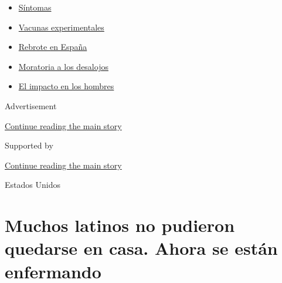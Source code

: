 \begin{itemize}
\tightlist
\item
  \href{https://www.nytimes3xbfgragh.onion/es/interactive/2020/08/06/espanol/ciencia-y-tecnologia/tengo-covid-19-sintomas.html?name=styln-coronavirus-es\&region=TOP_BANNER\&block=storyline_menu_recirc\&action=click\&pgtype=Article\&impression_id=e2b81a61-f2b5-11ea-9507-e581488c52dd\&variant=undefined}{Síntomas}
\item
  \href{https://www.nytimes3xbfgragh.onion/es/2020/09/02/espanol/ciencia-y-tecnologia/vacunas-experimentales-coronavirus.html?name=styln-coronavirus-es\&region=TOP_BANNER\&block=storyline_menu_recirc\&action=click\&pgtype=Article\&impression_id=e2b81a62-f2b5-11ea-9507-e581488c52dd\&variant=undefined}{Vacunas
  experimentales}
\item
  \href{https://www.nytimes3xbfgragh.onion/es/2020/08/31/espanol/mundo/rebrote-espana.html?name=styln-coronavirus-es\&region=TOP_BANNER\&block=storyline_menu_recirc\&action=click\&pgtype=Article\&impression_id=e2b84170-f2b5-11ea-9507-e581488c52dd\&variant=undefined}{Rebrote
  en España}
\item
  \href{https://www.nytimes3xbfgragh.onion/es/2020/09/02/espanol/negocios/desalojos-trump.html?name=styln-coronavirus-es\&region=TOP_BANNER\&block=storyline_menu_recirc\&action=click\&pgtype=Article\&impression_id=e2b84171-f2b5-11ea-9507-e581488c52dd\&variant=undefined}{Moratoria
  a los desalojos}
\item
  \href{https://www.nytimes3xbfgragh.onion/es/2020/08/26/espanol/ciencia-y-tecnologia/coronavirus-afecta-hombres.html?name=styln-coronavirus-es\&region=TOP_BANNER\&block=storyline_menu_recirc\&action=click\&pgtype=Article\&impression_id=e2b84172-f2b5-11ea-9507-e581488c52dd\&variant=undefined}{El
  impacto en los hombres}
\end{itemize}

Advertisement

\protect\hyperlink{after-top}{Continue reading the main story}

Supported by

\protect\hyperlink{after-sponsor}{Continue reading the main story}

Estados Unidos

\hypertarget{muchos-latinos-no-pudieron-quedarse-en-casa-ahora-se-estuxe1n-enfermando}{%
\section{Muchos latinos no pudieron quedarse en casa. Ahora se están
enfermando}\label{muchos-latinos-no-pudieron-quedarse-en-casa-ahora-se-estuxe1n-enfermando}}

